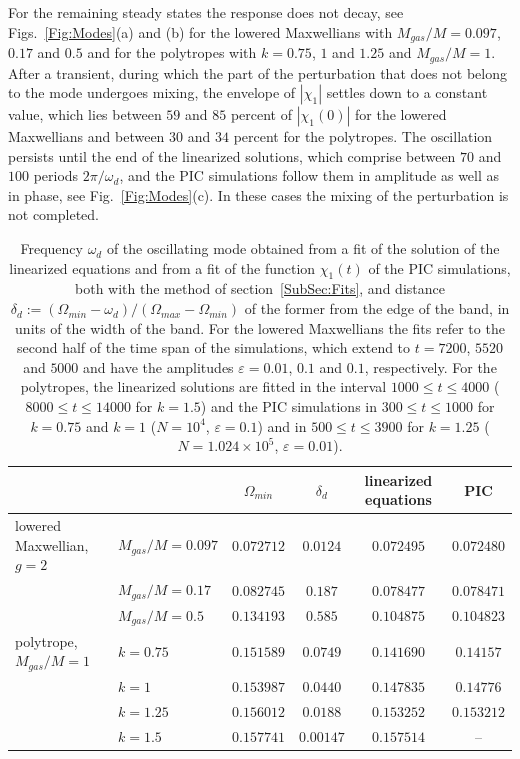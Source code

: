 For the remaining steady states the response does not decay, see Figs.~\ref{Fig:Modes}(a) and (b) for the lowered Maxwellians with $M_{gas}/M = 0.097$, $0.17$ and $0.5$ and for the polytropes with $k = 0.75$, $1$ and $1.25$ and $M_{gas}/M = 1$. After a transient, during which the part of the perturbation that does not belong to the mode undergoes mixing, the envelope of $|\chi_1|$ settles down to a constant value, which lies between $59$ and $85$ percent of $|\chi_1(0)|$ for the lowered Maxwellians and between $30$ and $34$ percent for the polytropes. The oscillation persists until the end of the linearized solutions, which comprise between $70$ and $100$ periods $2\pi/\omega_d$, and the PIC simulations follow them in amplitude as well as in phase, see Fig.~\ref{Fig:Modes}(c). In these cases the mixing of the perturbation is not completed.

\begin{table}[htp]
\begin{center}
\begin{tabular}{ll|cc|cc}
\hline\hline
 & & $\Omega_{min}$ & $\delta_d$ & linearized equations & PIC \\
\hline
lowered Maxwellian, $g = 2$ & $M_{gas}/M = 0.097$ & $0.072712$ & $0.0124$ & $0.072495$ & $0.072480$ \\
 & $M_{gas}/M = 0.17$ & $0.082745$ & $0.187$ & $0.078477$ & $0.078471$ \\
 & $M_{gas}/M = 0.5$ & $0.134193$ & $0.585$ & $0.104875$ & $0.104823$ \\
\hline
polytrope, $M_{gas}/M = 1$ & $k = 0.75$ & $0.151589$ & $0.0749$ & $0.141690$ & $0.14157$ \\
 & $k = 1$ & $0.153987$ & $0.0440$ & $0.147835$ & $0.14776$ \\
 & $k = 1.25$ & $0.156012$ & $0.0188$ & $0.153252$ & $0.153212$ \\
 & $k = 1.5$ & $0.157741$ & $0.00147$ & $0.157514$ & -- \\
\hline\hline
\end{tabular}
\end{center}
\caption{Frequency $\omega_d$ of the oscillating mode obtained from a fit of the solution of the linearized equations and from a fit of the function $\chi_1(t)$ of the PIC simulations, both with the method of section~\ref{SubSec:Fits}, and distance $\delta_d := (\Omega_{min} - \omega_d)/(\Omega_{max} - \Omega_{min})$ of the former from the edge of the band, in units of the width of the band. For the lowered Maxwellians the fits refer to the second half of the time span of the simulations, which extend to $t = 7200$, $5520$ and $5000$ and have the amplitudes $\varepsilon = 0.01$, $0.1$ and $0.1$, respectively. For the polytropes, the linearized solutions are fitted in the interval $1000\leq t\leq 4000$ ($8000\leq t\leq 14000$ for $k = 1.5$) and the PIC simulations in $300\leq t\leq 1000$ for $k = 0.75$ and $k = 1$ ($N = 10^4$, $\varepsilon = 0.1$) and in $500\leq t\leq 3900$ for $k = 1.25$ ($N = 1.024\times 10^5$, $\varepsilon = 0.01$).}
\label{Tab:Modes}
\end{table}

